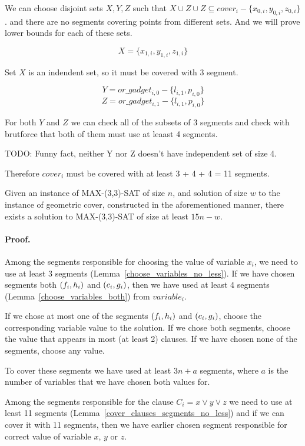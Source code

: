 We can choose disjoint sets $X, Y, Z$ such that
$X \cup Z \cup Z \subseteq cover_i - \{x_{0, i}, y_{0, i}, z_{0, i}\}$.
and there are no segments covering points from different sets.
And we will prove lower bounds for each of these sets.

$$X = \{x_{1, i}, y_{1, i}, z_{1, i}\}$$

Set $X$ is an indendent set, so it must be covered with 3 segment.

$$Y = or\_gadget_{i, 0} - \{l_{i, 1}, p_{i, 0}\}$$
$$Z = or\_gadget_{i, 1} - \{l_{i, 1}, p_{i, 0}\}$$


For both $Y$ and $Z$ we can check all of the subsets of 3 segments and
check with brutforce that both of them must use at leaast 4 segments.

TODO: Funny fact, neither Y nor Z doesn't have independent set of size 4.

Therefore $cover_i$ must be covered with at least 3 + 4 + 4 = 11 segments.

\begin{lemma}
	\label{construction_completness}
	Given an instance of MAX-(3,3)-SAT of size $n$,
	and solution of size $w$ to the instance of geometric cover,
	constructed in the aforementioned manner, 
	there exists a solution to MAX-(3,3)-SAT of size at least $15n - w$.
\end{lemma}
\paragraph{Proof.}
Among the segments responsible for choosing the value of variable $x_i$,
we need to use at least 3 segments (Lemma~\ref{choose_variables_no_less}).
If we have chosen segments both $(f_i, h_i)$ and $(c_i, g_i)$,
then we have used at least 4 segments (Lemma~\ref{choose_variables_both})
from $variable_i$.

If we chose at most one of the segments $(f_i, h_i)$ and $(c_i, g_i)$,
choose the corresponding variable value to the solution.
If we chose both segments,
choose the value that appears in most (at least 2) clauses.
If we have chosen none of the segments, choose any value.

To cover these segments we have used at least $3n + a$ segments,
where $a$ is the number of variables that we have chosen both
values for.

Among the segments responsible for the clause $C_i = x \lor y \lor z$
we need to use at least 11 segments
(Lemma~\ref{cover_clauses_segments_no_less})
and if we can cover it with 11 segments, then we have 
earlier chosen
segment responsible for correct value of variable $x$, $y$ or $z$.

